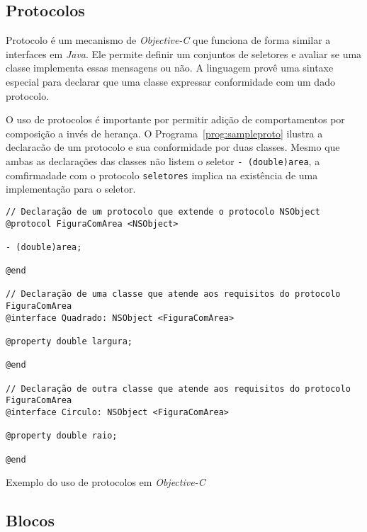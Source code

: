 \subsection{Protocolos}
\label{sec:protocol}

Protocolo é um mecanismo de \emph{Objective-C} que funciona de forma similar a interfaces em \emph{Java}.
Ele permite definir um conjuntos de seletores e avaliar se uma classe implementa essas mensagens ou não.
A linguagem provê uma sintaxe especial para declarar que uma classe expressar conformidade com um dado protocolo.

O uso de protocolos é importante por permitir adição de comportamentos por composição a invés de herança.
O Programa~\ref{prog:sampleproto} ilustra a declaracão de um protocolo e sua conformidade por duas classes.
Mesmo que ambas as declarações das classes não listem o seletor \texttt{- (double)area}, a comfirmadade
com o protocolo \texttt{seletores} implica na existência de uma implementação para o seletor.

\begin{program}
  \centering

\lstset{language=[Objective]C}
\begin{lstlisting}[style=wider]
// Declaração de um protocolo que extende o protocolo NSObject
@protocol FiguraComArea <NSObject>

- (double)area;

@end

// Declaração de uma classe que atende aos requisitos do protocolo FiguraComArea
@interface Quadrado: NSObject <FiguraComArea>

@property double largura;

@end

// Declaração de outra classe que atende aos requisitos do protocolo FiguraComArea
@interface Circulo: NSObject <FiguraComArea>

@property double raio;

@end

\end{lstlisting}

  \caption{Exemplo do uso de protocolos em \emph{Objective-C}\label{prog:sampleproto}}
\end{program}

\subsection{Blocos}
\label{sec:blocks}

